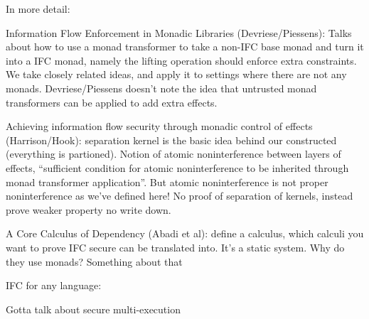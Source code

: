 \documentclass{sigplanconf}
\begin{document}
{{In more detail:

Information Flow Enforcement in Monadic Libraries (Devriese/Piessens): Talks about how to use a monad transformer to take a non-IFC base monad and turn it into a IFC monad, namely the lifting operation should enforce extra constraints.  We take closely related ideas, and apply it to settings where there are not any monads.  Devriese/Piessens doesn't note the idea that untrusted monad transformers can be applied to add extra effects.

Achieving information flow security through monadic control of effects (Harrison/Hook): separation kernel is the basic idea behind our constructed (everything is partioned).  Notion of atomic noninterference between layers of effects, ``sufficient condition for atomic noninterference to be inherited through monad transformer application''.  But atomic noninterference is not proper noninterference as we've defined here! No proof of separation of kernels, instead prove weaker property no write down.

A Core Calculus of Dependency (Abadi et al): define a calculus, which calculi you want to prove IFC secure can be translated into.  It's a static system.  Why do they use monads?  Something about that
}


IFC for any language:

Gotta talk about secure multi-execution
}





\end{document}
